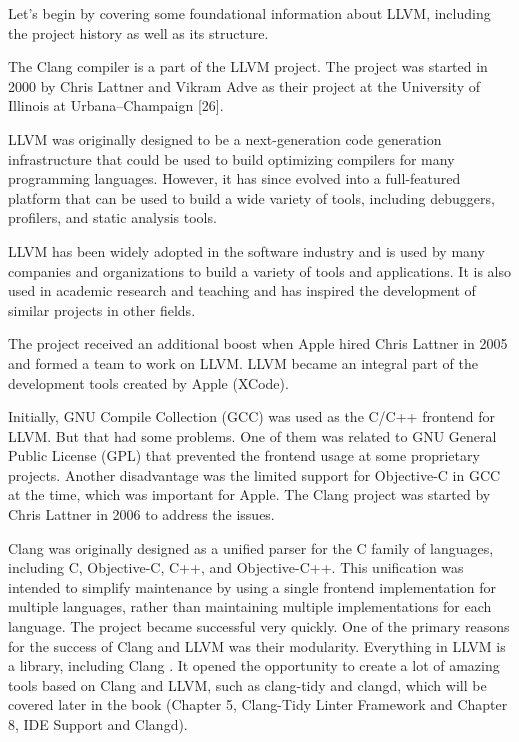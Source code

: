 Let's begin by covering some foundational information about LLVM, including the project history as well as its structure.




The Clang compiler is a part of the LLVM project. The project was started in 2000 by Chris Lattner and Vikram Adve as their project at the University of Illinois at Urbana–Champaign [26].

LLVM was originally designed to be a next-generation code generation infrastructure that could be used to build optimizing compilers for many programming languages. However, it has since evolved into a full-featured platform that can be used to build a wide variety of tools, including debuggers, profilers, and static analysis tools.

LLVM has been widely adopted in the software industry and is used by many companies and organizations to build a variety of tools and applications. It is also used in academic research and teaching and has inspired the development of similar projects in other fields.

The project received an additional boost when Apple hired Chris Lattner in 2005 and formed a team to work on LLVM. LLVM became an integral part of the development tools created by Apple (XCode).

Initially, GNU Compile Collection (GCC) was used as the C/C++ frontend for LLVM. But that had some problems. One of them was related to GNU General Public License (GPL) that prevented the frontend usage at some proprietary projects. Another disadvantage was the limited support for Objective-C in GCC at the time, which was important for Apple. The Clang project was started by Chris Lattner in 2006 to address the issues.

Clang was originally designed as a unified parser for the C family of languages, including C, Objective-C, C++, and Objective-C++. This unification was intended to simplify maintenance by using a single frontend implementation for multiple languages, rather than maintaining multiple implementations for each language. The project became successful very quickly. One of the primary reasons for the success of Clang and LLVM was their modularity. Everything in LLVM is a library, including Clang . It opened the opportunity to create a lot of amazing tools based on Clang and LLVM, such as clang-tidy and clangd, which will be covered later in the book (Chapter 5, Clang-Tidy Linter Framework and Chapter 8, IDE Support and Clangd).

